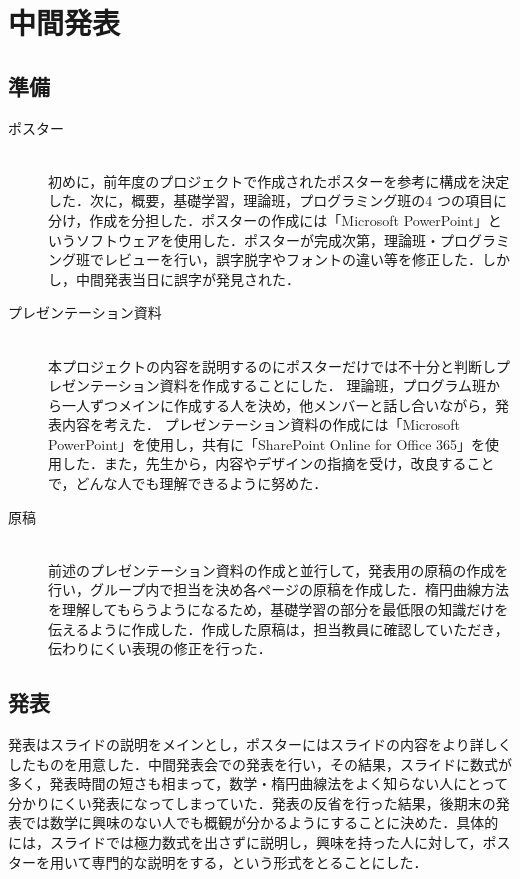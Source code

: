 \documentclass[openany,11pt,papersize]{jsbook}
\begin{document}

\section{中間発表}

\subsection{準備}
\begin{description}
\item[ポスター]\mbox{}\\
初めに，前年度のプロジェクトで作成されたポスターを参考に構成を決定した．次に，概要，基礎学習，理論班，プログラミング班の4 つの項目に分け，作成を分担した．ポスターの作成には「Microsoft PowerPoint」というソフトウェアを使用した．ポスターが完成次第，理論班・プログラミング班でレビューを行い，誤字脱字やフォントの違い等を修正した．しかし，中間発表当日に誤字が発見された．


\item[プレゼンテーション資料]\mbox{}\\
本プロジェクトの内容を説明するのにポスターだけでは不十分と判断しプレゼンテーション資料を作成することにした．
理論班，プログラム班から一人ずつメインに作成する人を決め，他メンバーと話し合いながら，発表内容を考えた．
プレゼンテーション資料の作成には「Microsoft PowerPoint」を使用し，共有に「SharePoint Online for Office 365」を使用した．また，先生から，内容やデザインの指摘を受け，改良することで，どんな人でも理解できるように努めた．


\item[原稿]\mbox{}\\
前述のプレゼンテーション資料の作成と並行して，発表用の原稿の作成を行い，グループ内で担当を決め各ページの原稿を作成した．楕円曲線方法を理解してもらうようになるため，基礎学習の部分を最低限の知識だけを伝えるように作成した．作成した原稿は，担当教員に確認していただき，伝わりにくい表現の修正を行った．
\end{description}


\subsection{発表}

発表はスライドの説明をメインとし，ポスターにはスライドの内容をより詳しくしたものを用意した．中間発表会での発表を行い，その結果，スライドに数式が多く，発表時間の短さも相まって，数学・楕円曲線法をよく知らない人にとって分かりにくい発表になってしまっていた．発表の反省を行った結果，後期末の発表では数学に興味のない人でも概観が分かるようにすることに決めた．具体的には，スライドでは極力数式を出さずに説明し，興味を持った人に対して，ポスターを用いて専門的な説明をする，という形式をとることにした．
\end{document}
